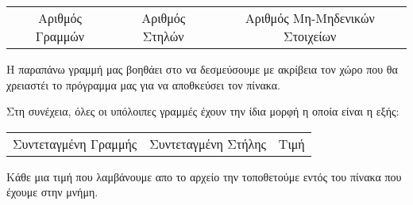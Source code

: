\begin{center}
\begin{tabular}{ c c c }
 Αριθμός Γραμμών & Αριθμός Στηλών & Αριθμός Μη-Μηδενικών Στοιχείων
\end{tabular}
\end{center}

Η παραπάνω γραμμή μας βοηθάει στο να δεσμεύσουμε με ακρίβεια τον χώρο που θα χρειαστέι το πρόγραμμα μας για να αποθκεύσει τον πίνακα. 

Στη συνέχεια, όλες οι υπόλοιπες γραμμές έχουν την ίδια μορφή η οποία είναι η εξής:

\begin{center}
\begin{tabular}{ c c c }
 Συντεταγμένη Γραμμής & Συντεταγμένη Στήλης & Τιμή
\end{tabular}
\end{center}

Κάθε μια τιμή που λαμβάνουμε απο το αρχείο την τοποθετούμε εντός του πίνακα που έχουμε στην μνήμη.

